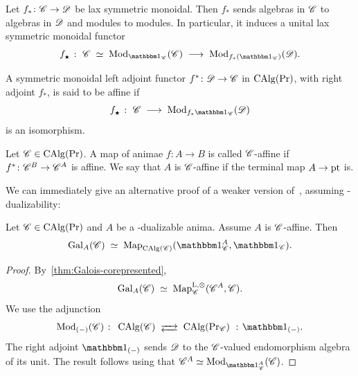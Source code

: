 \documentclass[english,svgnames,table]{article}
\begin{document}
    Let $f_* \colon \mathscr{C} \to \mathscr{D}$ be lax symmetric monoidal. Then $f_*$ sends algebras in $\mathscr{C}$ to algebras in $\mathscr{D}$ and modules to modules. In particular, it induces a unital lax symmetric monoidal functor
    \begin{equation*}
        f_{\scriptscriptstyle\bigstar} \;\colon\; \cC \;\simeq\; \Mod_{\ounit_{\cC}}(\cC) \;\too\; \Mod_{f_*(\ounit_{\cC})} (\cD).
    \end{equation*}
    
    \begin{definition}
        A symmetric monoidal left adjoint functor $f^* \colon \mathscr{D} \to \mathscr{C}$ in $\operatorname{CAlg}(\operatorname{Pr})$, with right adjoint $f_*$, is said to be affine if
        \begin{equation*}
            f_{\scriptscriptstyle\bigstar} \;\colon\; \cC \;\too\; \Mod_{f_*\ounit_{\cC}} (\cD)
        \end{equation*}
        is an isomorphism.
    \end{definition}
    
    \begin{definition}
        Let $\mathscr{C} \in\operatorname{CAlg}(\operatorname{Pr})$. A map of animae $f \colon A \to B$ is called $\mathscr{C}$-affine if $f^* \colon \mathscr{C}^B \to \mathscr{C}^A$ is affine.
        We say that $A$ is $\mathscr{C}$-affine if the terminal map $A \to \mathrm{pt}$ is.
    \end{definition}
    
    We can immediately give an alternative proof of a weaker version of~\cite[Proposition~2.30]{BCSY-Fourier}, assuming \CO-dualizability:
    \begin{corollary}
    \label{cor:corepresntatbility-for-affines}
        Let $\mathscr{C} \in \operatorname{CAlg}(\operatorname{Pr})$ and $A$ be a \CO-dualizable anima. Assume $A$ is $\mathscr{C}$-affine. Then
        \begin{equation*}
            \Gal_A(\cC) \;\simeq\; \Map_{\CAlg(\cC)}(\ounit_{\cC}^A, \ounit_{\cC}).
        \end{equation*}
    \end{corollary}
    \begin{proof}
        By~\cref{thm:Galois-corepresented},
        \begin{equation*}
            \mathrm{Gal}_A(\mathscr{C}) \;\simeq\; \operatorname{Map}^{\mathrm{L},\otimes}_{\mathscr{C}}(\mathscr{C}^A, \mathscr{C}).
        \end{equation*}
        We use the adjunction
        \begin{equation*}
            \Mod_{(-)}(\cC) \;\colon\; \CAlg(\cC) \;\longadj\; \CAlgC \;\cocolon\; \ounit_{(-)}.
        \end{equation*}
        The right adjoint $\ounit_{(-)}$ sends $\mathscr{D}$ to the $\mathscr{C}$-valued endomorphism algebra of its unit.
        The result follows using that $\cC^A \simeq \Mod_{\ounit_{\cC}^A}(\cC)$.
    \end{proof}
    
\end{document}
